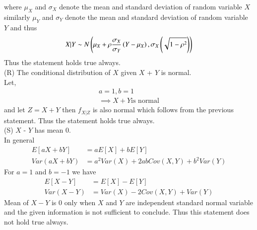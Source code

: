 \documentclass[journal,12pt,twocolumn]{IEEEtran}
\begin{document}
where $\mu_X$ and $\sigma_X$ denote the mean and standard deviation of random variable $X$ similarly $\mu_Y$ and $\sigma_Y$ denote the mean and standard deviation of random variable $Y$ and thus 
\begin{align}
   X|Y \sim N\left(\mu_X+\rho\frac{\sigma_X}{\sigma_Y}\left(Y-\mu_X\right),\sigma_X\left(\sqrt{1-\rho^2}\right)\right) 
\end{align}
 Thus the statement holds true always.
\\
(R) The conditional distribution of $X$ given $X$ + $Y$ is normal.\\
Let,
\begin{align}
a=1, b=1 \\
\implies X+Y \text{is normal}
\end{align}
and let $Z=X+Y$ then $f_{X|Z}$ is also normal which follows from the previous statement.
Thus the statement holds true always.
\\
(S) $X$ - $Y$ has mean $0$.\\
In general
\begin{align}
    E[aX+bY] &= aE[X]+bE[Y] \\
    Var(aX+bY) &= a^2Var(X)+2abCov(X,Y)+b^2Var(Y)
\end{align}
For $a=1$ and $b=-1$ we have
\begin{align}
  E[X-Y] &= E[X]-E[Y] \\
    Var(X-Y) &= Var(X)-2Cov(X,Y)+Var(Y)  
\end{align}
Mean of $X-Y$ is 0 only when $X$ and $Y$ are independent standard normal variable and the given information is not sufficient to conclude. Thus this statement does not hold true always. 
\end{document}
